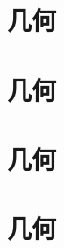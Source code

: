 \chapter{几何}\label{chapter00109}




\chapter{几何}\label{chapter00110}



\chapter{几何}\label{chapter00111}


\chapter{几何}\label{chapter00112}

